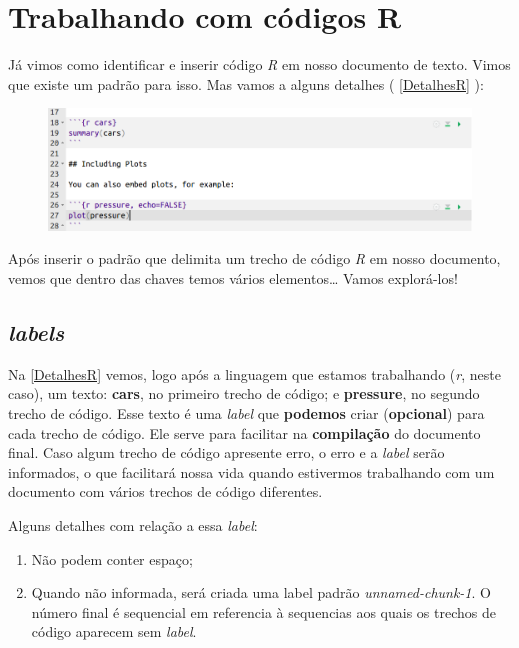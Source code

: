 \documentclass[]{book}
\providecommand{\tightlist}{%
  \setlength{\itemsep}{0pt}\setlength{\parskip}{0pt}}
\begin{document}
\hypertarget{TrechoR}{%
\chapter{Trabalhando com códigos R}\label{TrechoR}}

Já vimos como identificar e inserir código \emph{R} em nosso documento de texto. Vimos que existe um padrão para isso. Mas vamos a alguns detalhes ( \autoref{DetalhesR} ):

\begin{figure}
\centering
\includegraphics{./img/DetalhesCodigoR.png}
\caption{\label{DetalhesR}}
\end{figure}

Após inserir o padrão que delimita um trecho de código \emph{R} em nosso documento, vemos que dentro das chaves temos vários elementos\ldots{} Vamos explorá-los!

\hypertarget{RLabels}{%
\section{\texorpdfstring{\emph{labels}}{labels}}\label{RLabels}}

Na \autoref{DetalhesR} vemos, logo após a linguagem que estamos trabalhando (\emph{r}, neste caso), um texto: \textbf{cars}, no primeiro trecho de código; e \textbf{pressure}, no segundo trecho de código. Esse texto é uma \emph{label} que \textbf{podemos} criar (\textbf{opcional}) para cada trecho de código. Ele serve para facilitar na \textbf{compilação} do documento final. Caso algum trecho de código apresente erro, o erro e a \emph{label} serão informados, o que facilitará nossa vida quando estivermos trabalhando com um documento com vários trechos de código diferentes.

Alguns detalhes com relação a essa \emph{label}:

\begin{enumerate}
\def\labelenumi{\arabic{enumi}.}
\tightlist
\item
  Não podem conter espaço;
\item
  Quando não informada, será criada uma label padrão \emph{unnamed-chunk-1}. O número final é sequencial em referencia à sequencias aos quais os trechos de código aparecem sem \emph{label}.
\end{enumerate}
\end{document}
